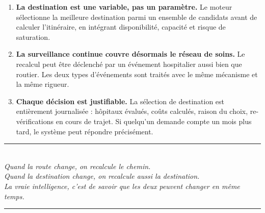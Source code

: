 \documentclass[12pt,a4paper]{article}
\theoremstyle{definition}
\theoremstyle{remark}
\begin{document}
\begin{enumerate}[leftmargin=2em, itemsep=4pt]
  \item \textbf{La destination est une variable, pas un paramètre.}
    Le moteur sélectionne la meilleure destination parmi un ensemble
    de candidats avant de calculer l'itinéraire, en intégrant
    disponibilité, capacité et risque de saturation.

  \item \textbf{La surveillance continue couvre désormais le réseau
    de soins.} Le recalcul peut être déclenché par un événement
    hospitalier aussi bien que routier. Les deux types d'événements
    sont traités avec le même mécanisme et la même rigueur.

  \item \textbf{Chaque décision est justifiable.} La sélection de
    destination est entièrement journalisée : hôpitaux évalués, coûts
    calculés, raison du choix, re-vérifications en cours de trajet.
    Si quelqu'un demande compte un mois plus tard, le système peut
    répondre précisément.
\end{enumerate}

\medskip
\begin{center}
  {\color{twist}\rule{0.5\linewidth}{1pt}}\\[0.5em]
  {\itshape \og{}Quand la route change, on recalcule le chemin.\\
  Quand la destination change, on recalcule aussi la destination.\\
  La vraie intelligence, c'est de savoir que les deux peuvent changer en même temps.\fg{}}\\[0.5em]
  {\color{twist}\rule{0.5\linewidth}{1pt}}
\end{center}
\end{document}
